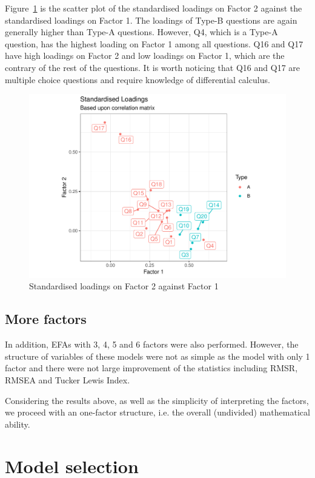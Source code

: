\documentclass[a4paper]{report}
\begin{document}
Figure~\ref{fig:EFA_pre17_2} is the scatter plot of the standardised loadings on Factor 2 against the standardised loadings on Factor 1. The loadings of Type-B questions are again generally higher than Type-A questions. However, Q4, which is a Type-A question, has the highest loading on Factor 1 among all questions. Q16 and Q17 have high loadings on Factor 2 and low loadings on Factor 1, which are the contrary of the rest of the questions. It is worth noticing that Q16 and Q17 are multiple choice questions and require knowledge of differential calculus. 

\begin{figure}[H]
  \centering
  \includegraphics[width=\linewidth]{fig/EFA_pre17_2.pdf}
  \caption{\label{fig:EFA_pre17_2}Standardised loadings on Factor 2 against Factor 1}
\end{figure}

\subsection{More factors}

In addition, EFAs with 3, 4, 5 and 6 factors were also performed. However, the structure of variables of these models were not as simple as the model with only 1 factor and there were not large improvement of the statistics including RMSR, RMSEA and Tucker Lewis Index. 

Considering the results above, as well as the simplicity of interpreting the factors, we proceed with an one-factor structure, i.e. the overall (undivided) mathematical ability. 

\section{Model selection}
\end{document}

